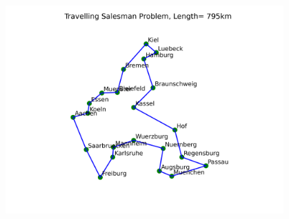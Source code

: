 \begin{center}
    \includegraphics[width=0.80\textwidth]{../results/tsp_1.png}
    \label{fig:tsp_1}
\end{center}
